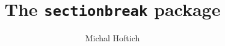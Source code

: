 \documentclass{article}
\begin{document}
\title{The \texttt{sectionbreak} package}
\author{Michal Hoftich}





\end{document}
